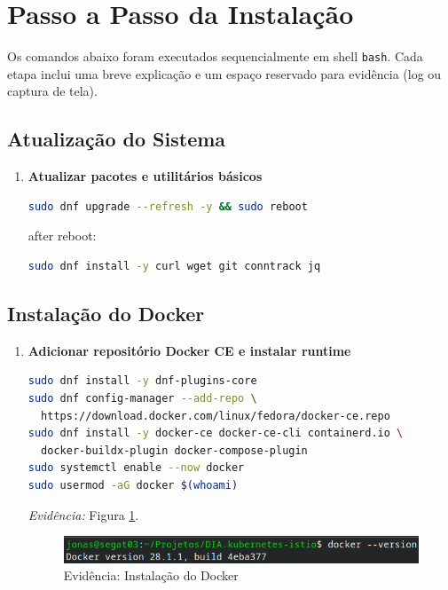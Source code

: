 \documentclass[9pt,a4paper,twocolumn,twoside]{tau-class/tau}
\begin{document}
\section{Passo a Passo da Instalação}
\label{sec:passoapasso}
Os comandos abaixo foram executados sequencialmente em shell \texttt{bash}. Cada
etapa inclui uma breve explicação e um espaço reservado para evidência (log ou
captura de tela).

\subsection{Atualização do Sistema}
\begin{enumerate}[label=\arabic*.]
  \item \textbf{Atualizar pacotes e utilitários básicos}
\begin{lstlisting}[language=Bash]
sudo dnf upgrade --refresh -y && sudo reboot
\end{lstlisting}
    after reboot:
\begin{lstlisting}[language=Bash]
sudo dnf install -y curl wget git conntrack jq
\end{lstlisting}
\end{enumerate}

\subsection{Instalação do Docker}
\begin{enumerate}[label=\arabic*.]
    \item\textbf{Adicionar repositório Docker CE e instalar runtime}

\begin{lstlisting}[language=Bash]
sudo dnf install -y dnf-plugins-core
sudo dnf config-manager --add-repo \
  https://download.docker.com/linux/fedora/docker-ce.repo
sudo dnf install -y docker-ce docker-ce-cli containerd.io \
  docker-buildx-plugin docker-compose-plugin
sudo systemctl enable --now docker
sudo usermod -aG docker $(whoami)
\end{lstlisting}
\textit{Evidência:} Figura \ref{fig:docker}.\\

\begin{figure}[h]
    \centering
    \includegraphics[width=1\linewidth]{figures/evidence-docker}
    \caption{Evidência: Instalação do Docker}
    \label{fig:docker}
\end{figure}
\end{enumerate}
\end{document}
